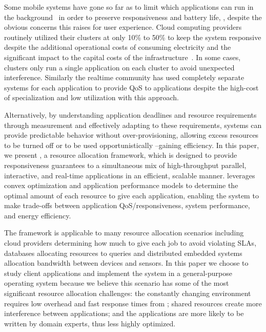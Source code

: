 Some mobile systems have gone so far as to limit which applications can run in the background~\cite{iOsDev} in order to preserve responsiveness and battery life,  , despite the obvious concerns this raises for user experience.  Cloud computing providers routinely utilized their clusters at only 10\% to 50\% to keep the system responsive despite the additional operational costs of consuming electricity and the significant impact to the capital costs of the infrastructure~\cite{Barroso2009,Hennessy2011}.   In some cases, clusters only run a single application on each cluster to avoid unexpected interference.  Similarly the realtime community has used completely separate systems for each application to provide QoS to applications despite the high-cost of specialization and low utilization with this approach.

Alternatively, by understanding application deadlines and resource requirements through measurement and effectively adapting to these requirements, systems can provide predictable behavior without over-provisioning, allowing excess resources to be turned off or to be used opportunistically --gaining efficiency.  In this paper, we present \pacora, a resource allocation framework, which is designed to provide responsiveness guarantees to a simultaneous mix of high-throughput parallel, interactive, and real-time applications in an efficient, scalable manner. \pacora leverages convex optimization and application performance models to determine the optimal amount of each resource to give each application, enabling the system to make trade-offs between application QoS/responsiveness, system performance, and energy efficiency. 

The \pacora framework is applicable to many resource allocation scenarios including cloud providers determining how much to give each job to avoid violating SLAs, databases allocating resources to queries and distributed embedded systems allocation bandwidth between devices and sensors.  In this paper we choose to study client applications and implement the system in a general-purpose operating system because we believe this scenario has some of the most significant resource allocation challenges: the constantly changing environment requires low overhead and fast response times from \pacora;  shared resources create more interference between applications; and the applications are more likely to be written by domain experts, thus less highly optimized.



